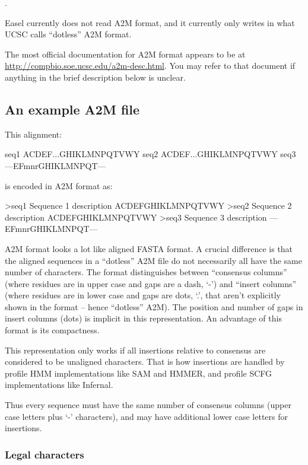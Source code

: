 .

Easel currently does not read A2M format, and it currently only writes
in what UCSC calls ``dotless'' A2M format.

The most official documentation for A2M format appears to be at
\url{http://compbio.soe.ucsc.edu/a2m-desc.html}. You may refer to that
document if anything in the brief description below is unclear.

\subsection{An example A2M file}

This alignment:

\begin{cchunk}
seq1  ACDEF...GHIKLMNPQTVWY
seq2  ACDEF...GHIKLMNPQTVWY
seq3  ---EFmnrGHIKLMNPQT---
\end{cchunk}

\noindent 
is encoded in A2M format as:

\begin{cchunk}
>seq1  Sequence 1 description
ACDEFGHIKLMNPQTVWY
>seq2  Sequence 2 description
ACDEFGHIKLMNPQTVWY
>seq3  Sequence 3 description
---EFmnrGHIKLMNPQT---
\end{cchunk}

A2M format looks a lot like aligned FASTA format. A crucial difference
is that the aligned sequences in a ``dotless'' A2M file do not
necessarily all have the same number of characters. The format
distinguishes between ``consensus columns'' (where residues are in
upper case and gaps are a dash, `-') and ``insert columns'' (where
residues are in lower case and gaps are dots, `.', that aren't
explicitly shown in the format -- hence ``dotless'' A2M). The position
and number of gaps in insert columns (dots) is implicit in this
representation.  An advantage of this format is its compactness.

This representation only works if all insertions relative to consensus
are considered to be unaligned characters. That is how insertions are
handled by profile HMM implementations like SAM and HMMER, and profile
SCFG implementations like Infernal.

Thus every sequence must have the same number of consensus columns
(upper case letters plus `-' characters), and may have additional lower
case letters for insertions.

\subsubsection{Legal characters}

